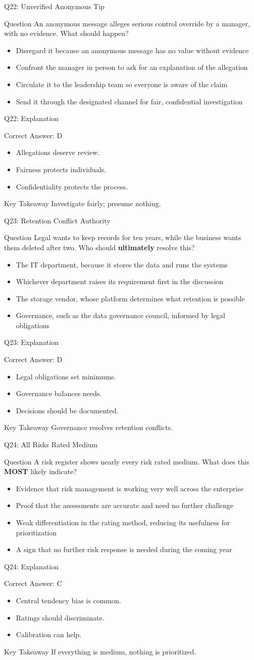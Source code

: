 \documentclass[aspectratio=169]{beamer}
\newcommand{\hq}[7]{%
	\begin{frame}{Q#1: #2}
		\begin{block}{Question}
			#3
		\end{block}
		\begin{itemize}
			#4
		\end{itemize}
	\end{frame}
	\begin{frame}{Q#1: Explanation}
		\begin{block}{Correct Answer: #5}
			\begin{itemize}
				#6
			\end{itemize}
		\end{block}
		\begin{alertblock}{Key Takeaway}
			#7
		\end{alertblock}
	\end{frame}
}
\begin{document}
	\hq{22}{Unverified Anonymous Tip}
	{An anonymous message alleges serious control override by a manager, with no evidence. What should happen?}
	{\item[\textbf{(A)}] Disregard it because an anonymous message has no value without evidence
		\item[\textbf{(B)}] Confront the manager in person to ask for an explanation of the allegation
		\item[\textbf{(C)}] Circulate it to the leadership team so everyone is aware of the claim
		\item[\textbf{(D)}] Send it through the designated channel for fair, confidential investigation}
	{D}
	{\item Allegations deserve review.
		\item Fairness protects individuals.
		\item Confidentiality protects the process.}
	{Investigate fairly; presume nothing.}

	\hq{23}{Retention Conflict Authority}
	{Legal wants to keep records for ten years, while the business wants them deleted after two. Who should \textbf{ultimately} resolve this?}
	{\item[\textbf{(A)}] The IT department, because it stores the data and runs the systems
		\item[\textbf{(B)}] Whichever department raises its requirement first in the discussion
		\item[\textbf{(C)}] The storage vendor, whose platform determines what retention is possible
		\item[\textbf{(D)}] Governance, such as the data governance council, informed by legal obligations}
	{D}
	{\item Legal obligations set minimums.
		\item Governance balances needs.
		\item Decisions should be documented.}
	{Governance resolves retention conflicts.}

	\hq{24}{All Risks Rated Medium}
	{A risk register shows nearly every risk rated medium. What does this \textbf{MOST} likely indicate?}
	{\item[\textbf{(A)}] Evidence that risk management is working very well across the enterprise
		\item[\textbf{(B)}] Proof that the assessments are accurate and need no further challenge
		\item[\textbf{(C)}] Weak differentiation in the rating method, reducing its usefulness for prioritization
		\item[\textbf{(D)}] A sign that no further risk response is needed during the coming year}
	{C}
	{\item Central tendency bias is common.
		\item Ratings should discriminate.
		\item Calibration can help.}
	{If everything is medium, nothing is prioritized.}
\end{document}
